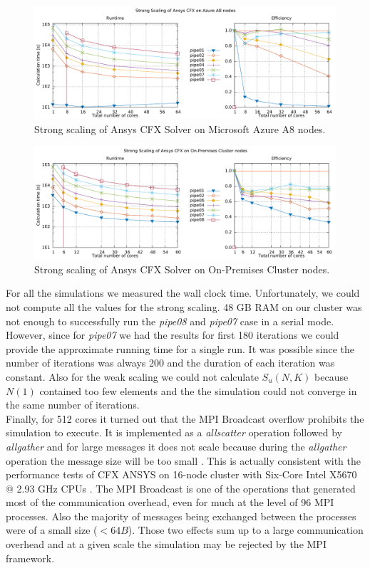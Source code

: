 \documentclass[3p,times]{elsarticle}
\begin{document}

\begin{figure}
\centering
	\centering
	\includegraphics[width=.7\linewidth]{gplt-a8-strong-pipe}	
	\caption{Strong scaling of Ansys CFX Solver on Microsoft Azure A8 nodes. }
	\label{fig:strongA8}
\end{figure}

\begin{figure}
	\centering
	\includegraphics[width=.7\linewidth]{gplt-hsr-strong-pipe}
	\caption{Strong scaling of Ansys CFX Solver on On-Premises Cluster nodes. }
	\label{fig:strongHSR}
\end{figure}



For all the simulations we measured the wall clock time. Unfortunately, we could not compute all the values for the strong scaling. 48 GB RAM on our cluster was not enough to successfully run the \textit{pipe08} and \textit{pipe07} case in a serial mode. However, since for \textit{pipe07} we had the results for first 180 iterations we could provide the approximate running time for a single run. It was possible since the number of iterations was always 200 and the duration of each iteration was constant. Also for the weak scaling we could not calculate $S_u(N,K)$ because $N(1)$ contained too few elements and the the simulation could not converge in the same number of iterations. \\
Finally, for 512 cores it turned out that the MPI Broadcast overflow prohibits the simulation to execute. It is implemented as a \textit{allscatter} operation followed by \textit{allgather} and for large messages it does not scale because during the \textit{allgather} operation the message size will be too small \cite{Balaji}. This is actually consistent with the performance tests of CFX ANSYS on 16-node cluster with Six-Core Intel X5670 @ 2.93 GHz CPUs \cite{ansysScaling}. The MPI Broadcast is one of the operations that generated most of the communication overhead, even for much at the level of 96 MPI processes. Also the majority of messages being exchanged between the processes were of a small size ($< 64B$). Those two effects sum up to a large communication overhead and at a given scale the simulation may be rejected by the MPI framework.
\end{document}
